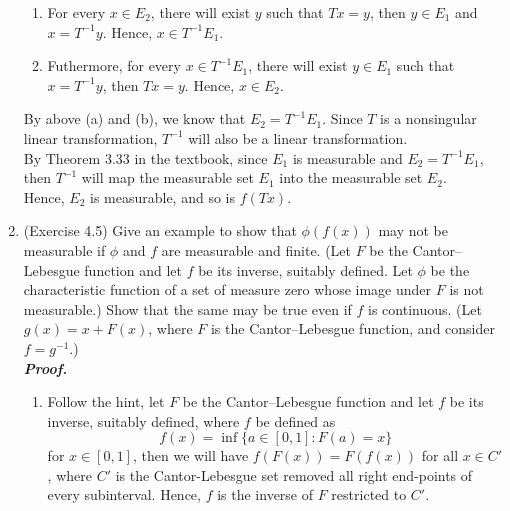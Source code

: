 \documentclass[a4paper,11pt]{article}
\begin{document}
\begin{enumerate}
\begin{enumerate}

\item For every $x \in E_2$, there will exist $y$ such that $Tx = y$, then $y \in E_1$ and $x = T^{-1}y$. Hence, $x \in T^{-1} E_1$.

\item Futhermore, for every $x \in T^{-1} E_1$, there will exist $y \in E_1$ such that $x = T^{-1}y$, then $Tx = y$. Hence, $x \in E_2$.

\end{enumerate}

By above (a) and (b), we know that $E_2=T^{-1}E_1$. Since $T$ is a nonsingular linear transformation, $T^{-1}$ will also be a linear transformation.\\
By Theorem 3.33 in the textbook, since $E_1$ is measurable and $E_2=T^{-1}E_1$, then $T^{-1}$ will map the measurable set $E_1$ into the measurable set $E_2$.\\
Hence, $E_2$ is measurable, and so is $f(Tx)$.
\newline



\newpage




\item (Exercise 4.5)
Give an example to show that $\phi (f(x))$ may not be measurable if $\phi$ and $f$ are measurable and finite. (Let $F$ be the Cantor–Lebesgue function and let $f$ be its inverse, suitably defined. Let $\phi$ be the characteristic function of a set of measure zero whose image under $F$ is not measurable.) Show that the same may be true even if $f$ is continuous. (Let $g(x) = x + F(x)$, where $F$ is the Cantor–Lebesgue function, and consider $f = g^{-1}$.)\\
\newline
\textit{\textbf {Proof.}}

\begin{enumerate}

\item
Follow the hint, let $F$ be the Cantor–Lebesgue function and let $f$ be its inverse, suitably defined, where $f$ be defined as
$$f(x) = \inf \{ a \in [0,1]: F(a) = x \}$$
for $x \in [0,1]$, then we will have $f(F(x)) = F(f(x))$ for all $x \in C'$, where $C'$ is the Cantor-Lebesgue set removed all right end-points of every subinterval. Hence, $f$ is the inverse of $F$ restricted to $C'$.\


\end{enumerate}
\end{enumerate}
\end{document}
